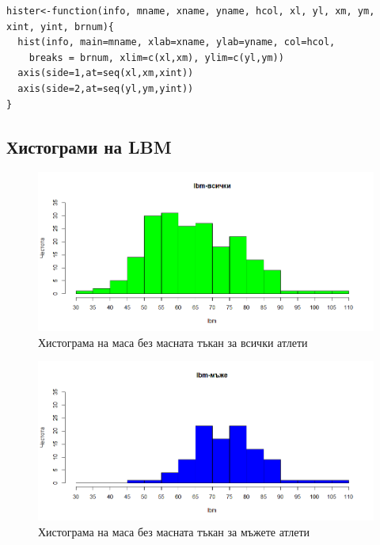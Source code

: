 \documentclass[12pt]{article}
\begin{document}
\begin{large}
\begin{verbatim}
hister<-function(info, mname, xname, yname, hcol, xl, yl, xm, ym, xint, yint, brnum){
  hist(info, main=mname, xlab=xname, ylab=yname, col=hcol,
   	breaks = brnum, xlim=c(xl,xm), ylim=c(yl,ym))
  axis(side=1,at=seq(xl,xm,xint))
  axis(side=2,at=seq(yl,ym,yint))
}
\end{verbatim}

\clearpage

\subsection{Хистограми на LBM}

\begin{figure}[h!]
\includegraphics[width=\textwidth,height=\textheight,keepaspectratio]{pics/lbmall}
\caption{Хистограма на маса без масната тъкан за всички атлети}
\end{figure}

\begin{figure}[h!]
\includegraphics[width=\textwidth,height=\textheight,keepaspectratio]{pics/lbmmen}
\caption{Хистограма на маса без масната тъкан за мъжете атлети}
\end{figure}


\end{large}
\end{document}
